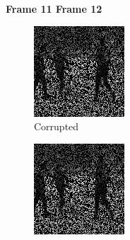 \begin{figure}
  \centering
  \textbf{\hspace{0.2in} Frame 11 \hspace{1.5in} Frame 12\hspace{0.5in}\vspace{0.1in}}
  \begin{subfigure}{0.4\textwidth}
    \centering
    \includegraphics[width=.9\textwidth]{Chapter7/Images/soccer40_masked_11.png}
    \caption{Corrupted}
  \end{subfigure}
  \begin{subfigure}{0.4\textwidth}
    \centering
    \includegraphics[width=.9\textwidth]{Chapter7/Images/soccer40_masked_12.png}

\end{subfigure}
\end{figure}
